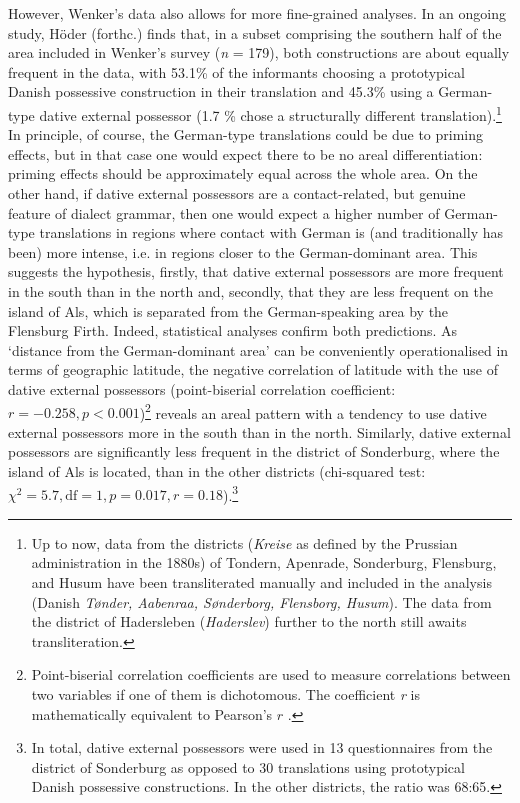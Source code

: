 \documentclass[output=paper]{langsci/langscibook}
\begin{document}
However, Wenker’s data also allows for more fine-grained analyses. In an ongoing study, Höder (forthc.) finds that, in a subset comprising the southern half of the area included in Wenker’s survey (\textit{n} = 179), both constructions are about equally frequent in the data, with 53.1\% of the informants choosing a prototypical Danish possessive construction in their translation and 45.3\% using a German-type dative external possessor (1.7 \% chose a structurally different translation).\footnote{Up to now, data from the districts (\textit{Kreise} as defined by the Prussian administration in the 1880s) of Tondern, Apenrade, Sonderburg, Flensburg, and Husum have been transliterated manually and included in the analysis (Danish \textit{Tønder, Aabenraa, Sønderborg, Flensborg, Husum}). The data from the district of Hadersleben (\textit{Haderslev}) further to the north still awaits transliteration.} In principle, of course, the German-type translations could be due to priming effects, but in that case one would expect there to be no areal differentiation: priming effects should be approximately equal across the whole area. On the other hand, if dative external possessors are a contact-related, but genuine feature of dialect grammar, then one would expect a higher number of German-type translations in regions where contact with German is (and traditionally has been) more intense, i.e. in regions closer to the German-dominant area. This suggests the hypothesis, firstly, that dative external possessors are more frequent in the south than in the north and, secondly, that they are less frequent on the island of Als, which is separated from the German-speaking area by the Flensburg Firth. Indeed, statistical analyses confirm both predictions. As ‘distance from the German-dominant area’ can be conveniently operationalised in terms of geographic latitude, the negative correlation of latitude with the use of dative external possessors (point-biserial correlation coefficient: $r = -0.258, p < 0.001$)\footnote{Point-biserial correlation coefficients are used to measure correlations between two variables if one of them is dichotomous. The coefficient \textit{r} is mathematically equivalent to Pearson’s $r$ \citep{Kornbrot.2014}.} reveals an areal pattern with a tendency to use dative external possessors more in the south than in the north. Similarly, dative external possessors are significantly less frequent in the district of Sonderburg, where the island of Als is located, than in the other districts (chi-squared test: $\chi^2 = 5.7, \text{df} = 1, p = 0.017, r =0.18$).\footnote{In total, dative external possessors were used in 13 questionnaires from the district of Sonderburg as opposed to 30 translations using prototypical Danish possessive constructions. In the other districts, the ratio was 68:65.}
\end{document}
